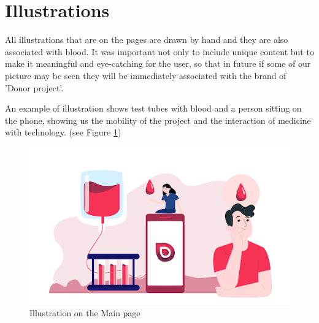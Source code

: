 \section{Illustrations}
All illustrations that are on the pages are drawn by hand and they are also associated with blood. It was important not only to include unique content but to make it meaningful and eye-catching for the user, so that in future if some of our picture may be seen they will be immediately associated with the brand of 'Donor project'.
\par
An example of illustration shows test tubes with blood and a person sitting on the phone, showing us the mobility of the project and the interaction of medicine with technology. (see Figure \ref{fig:mainillustration})
\begin{figure}[h]
    \centering
    \includegraphics[scale=0.7]{figures/3.png}
    \caption{Illustration on the Main page}
    \label{fig:mainillustration}
\end{figure}

